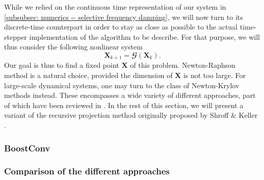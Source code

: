     While we relied on the continuous time representation of our system in \textsection \ref{subsubsec: numerics -- selective frequency damping}, we will now turn to its discrete-time counterpart in order to stay as close as possible to the actual time-stepper implementation of the algorithm to be describe. For that purpose, we will thus consider the following nonlinear system
    \begin{equation}
      \mathbf{X}_{k+1} = \mathbfcal{G}\left( \mathbf{X}_k \right).
      \label{eq: numerics -- discrete time system}
    \end{equation}
    Our goal is thus to find a fixed point $\mathbf{X}$ of this problem. Newton-Raphson method is a natural choice, provided the dimension of $\mathbf{X}$ is not too large. For large-scale dynamical systems, one may turn to the class of Newton-Krylov methods instead. These encompasses a wide variety of different approaches, part of which have been reviewed in \cite{jcp:knoll:2004}. In the rest of this section, we will present a variant of the recursive projection method originally proposed by Shroff \& Keller \cite{siam:shroff:1993}.


    \subsubsection{BoostConv}

    \subsubsection{Comparison of the different approaches}


